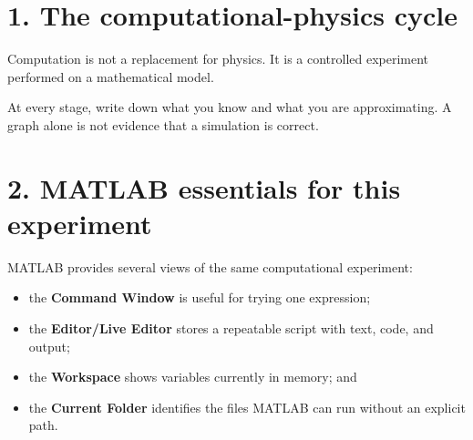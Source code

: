 \documentclass[11pt,a4paper]{article}
\begin{document}
\section*{1. The computational-physics cycle}
Computation is not a replacement for physics. It is a controlled experiment performed on a mathematical model.

\begin{center}
\end{center}

At every stage, write down what you know and what you are approximating. A graph alone is not evidence that a simulation is correct.

\section*{2. MATLAB essentials for this experiment}
MATLAB provides several views of the same computational experiment:
\begin{itemize}[nosep,leftmargin=5mm]
  \item the \textbf{Command Window} is useful for trying one expression;
  \item the \textbf{Editor/Live Editor} stores a repeatable script with text, code, and output;
  \item the \textbf{Workspace} shows variables currently in memory; and
  \item the \textbf{Current Folder} identifies the files MATLAB can run without an explicit path.
\end{itemize}
\end{document}
